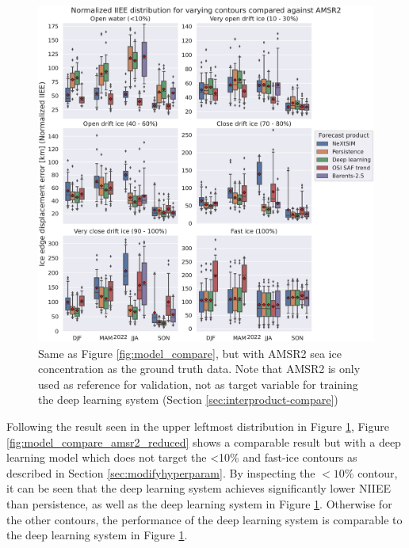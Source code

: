 \documentclass[../main/thesis.tex]{subfiles}
\begin{document}
\begin{figure}
    \centering
    \includegraphics[width=\textwidth]{model_intercomparisson_amsr2.pdf}
    \caption{\label{fig:model_compare_amsr2}Same as Figure \ref{fig:model_compare}, but with AMSR2 sea ice concentration as the ground truth data. Note that AMSR2 is only used as reference for validation, not as target variable for training the deep learning system (Section \ref{sec:interproduct-compare})}
\end{figure}

Following the result seen in the upper leftmost distribution in Figure \ref{fig:model_compare_amsr2}, Figure \ref{fig:model_compare_amsr2_reduced} shows a comparable result but with a deep learning model which does not target the <10\% and fast-ice contours as described in Section \ref{sec:modifyhyperparam}. By inspecting the $<10\%$ contour, it can be seen that the deep learning system achieves significantly lower NIIEE than persistence, as well as the deep learning system in Figure \ref{fig:model_compare_amsr2}. Otherwise for the other contours, the performance of the deep learning system is comparable to the deep learning system in Figure \ref{fig:model_compare_amsr2}.
\end{document}
